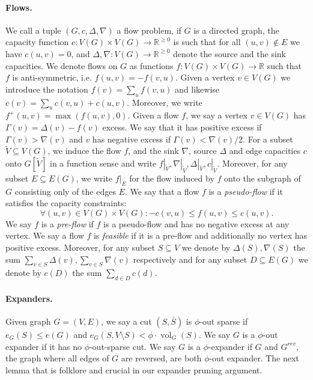 \documentclass[11pt]{article}
\newcommand\cc{\boldsymbol{\mathit{c}}}
\newcommand\ff{\boldsymbol{\mathit{f}}}
\newcommand\R{\mathbb{R}}
\DeclareMathOperator{\vol}{vol}
\begin{document}
\paragraph{Flows.} We call a tuple $(G, \cc, \Delta, \nabla)$ a flow problem, if $G$ is a directed graph, the capacity function $\cc: V(G) \times V(G) \rightarrow \R^{\geq 0}$ is such that for all $(u,v) \not \in E$ we have $\cc(u,v) = 0$, and $\Delta, \nabla: V(G) \rightarrow \R^{\geq 0}$ denote the source and the sink capacities.
We denote flows on $G$ as functions $\ff: V(G) \times V(G) \rightarrow \R$ such that $\ff$ is anti-symmetric, i.e. $\ff(u,v) = - \ff(v,u)$. Given a vertex $v \in V(G)$ we introduce the notation $\ff(v) = \sum_u \ff(v,u)$ and likewise $\cc(v) = \sum_u \cc(v,u) + \cc(u,v).$ Moreover, we write $\ff^+(u,v) = \max(\ff(u,v), 0)$. Given a flow $\ff$, we say a vertex $v \in V(G)$ has $\Gamma(v) = \Delta(v) - \ff(v)$ excess. We say that it has positive excess if $\Gamma(v) > \nabla(v)$ and $v$ has negative excess if $\Gamma(v) < \nabla(v)/2.$ For a subset $\tilde{V} \subseteq V(G)$, we induce the flow $\ff$, and the sink $\nabla$, source $\Delta$ and edge capacities $\cc$ onto $G[\tilde{V}]$ in a function sense and write $\ff|_{\tilde{V}}, \nabla|_{\tilde{V}}, \Delta|_{\tilde{V}}, \cc|_{\tilde{V}}$. Moreover, for any subset $E \subseteq E(G)$, we write $\ff|_{E}$ for the flow induced by $\ff$ onto the subgraph of $G$ consisting only of the edges $E$. We say that a flow $\ff$ is a \emph{pseudo-flow} if it satisfies the capacity constraints:
\[\forall (u,v) \in V(G) \times V(G): -\cc(v,u) \leq \ff(u,v) \leq \cc(u,v).\] We say $\ff$ is a \emph{pre-flow} if $\ff$ is a pseudo-flow and has no negative excess at any vertex. We say a flow $\ff$ is \emph{feasible} if it is a pre-flow and additionally no vertex has positive excess. Moreover, for any subset $S \subseteq V$ we denote by $\Delta(S), \nabla(S)$ the sum $\sum_{v \in S} \Delta(v), \sum_{v \in S} \nabla(v)$ respectively and for any subset $D \subseteq E(G)$ we denote by $\cc(D)$ the sum $\sum_{d \in D} \cc(d).$



\paragraph{Expanders.} 
Given graph $G = (V,E)$, we say a cut $(S, \bar{S})$ is $\phi$-out sparse if $e_G(S) \leq e(G)$ and $e_G(S, V \setminus S) < \phi \cdot \vol_G(S)$. We say $G$ is a $\phi$-out expander if it has no $\phi$-out-sparse cut. We say $G$ is a $\phi$-expander if $G$ and $G^{rev}$, the graph where all edges of $G$ are reversed, are both $\phi$-out expander. The next lemma that is folklore and crucial in our expander pruning argument.
\end{document}
